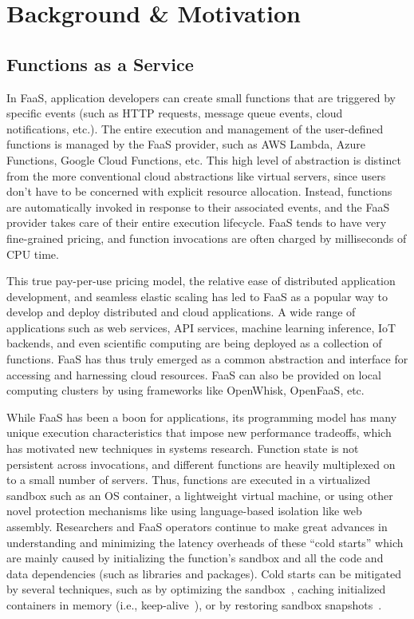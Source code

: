 \section{Background \& Motivation}

\subsection{Functions as a Service}

In FaaS, application developers can create small functions that are triggered by specific events (such as HTTP requests, message queue events, cloud notifications, etc.). 
The entire execution and management of the user-defined functions is managed by the FaaS provider, such as AWS Lambda, Azure Functions, Google Cloud Functions, etc.
This high level of abstraction is distinct from the more conventional cloud abstractions like virtual servers, since users don't have to be concerned with explicit resource allocation.
Instead, functions are automatically invoked in response to their associated events, and the FaaS provider takes care of their entire execution lifecycle.
FaaS tends to have very fine-grained pricing, and function invocations are often charged by milliseconds of CPU time.

This true pay-per-use pricing model, the relative ease of distributed application development, and seamless elastic scaling has led to FaaS as a popular way to develop and deploy distributed and cloud applications.
A wide range of applications such as web services, API services, machine learning inference, IoT backends, and even scientific computing are being deployed as a collection of functions.
FaaS has thus truly emerged as a common abstraction and interface for accessing and harnessing cloud resources.  
FaaS can also be provided on local computing clusters by using frameworks like OpenWhisk, OpenFaaS, etc. 

While FaaS has been a boon for applications, its programming model has many unique execution characteristics that impose new performance tradeoffs, which has motivated new techniques in systems research. 
Function state is not persistent across invocations, and different functions are heavily multiplexed on to a small number of servers. 
Thus, functions are executed in a virtualized sandbox such as an OS container, a lightweight virtual machine, or using other novel protection mechanisms like using language-based isolation like web assembly. 
Researchers and FaaS operators continue to make great advances in understanding and minimizing the latency overheads of these ``cold starts'' which are mainly caused by initializing the function's sandbox and all the code and data dependencies (such as libraries and packages).
Cold starts can be mitigated by several techniques, such as by optimizing the sandbox~\cite{catalyzer}, caching initialized containers in memory (i.e., keep-alive~\cite{lin_mitigating_2019, faascache}), or by restoring sandbox snapshots~\cite{vhive, faassnap}.

